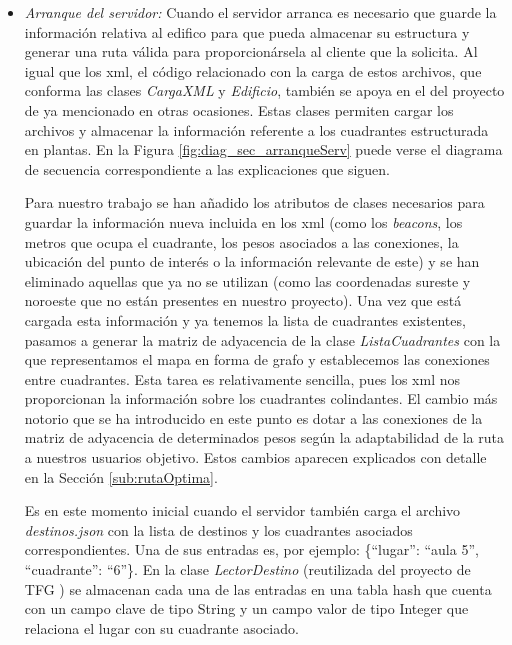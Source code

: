\begin{itemize}
	\item \textit{Arranque del servidor:} Cuando el servidor arranca es necesario que guarde la información relativa al edifico para que pueda almacenar su estructura y generar una ruta válida para proporcionársela al cliente que la solicita. Al igual que los xml, el código relacionado con la carga de estos archivos, que conforma las clases \textit{CargaXML} y \textit{Edificio}, también se apoya en el del proyecto de \cite{TFGguia} ya mencionado en otras ocasiones. Estas clases permiten cargar los archivos y almacenar la información referente a los cuadrantes estructurada en plantas. En la Figura \ref{fig:diag_sec_arranqueServ} puede verse el diagrama de secuencia correspondiente a las explicaciones que siguen.
	
	Para nuestro trabajo se han añadido los atributos de clases necesarios para guardar la información nueva incluida en los xml (como los \textit{beacons}, los metros que ocupa el cuadrante, los pesos asociados a las conexiones, la ubicación del punto de interés o la información relevante de este) y se han eliminado aquellas que ya no se utilizan (como las coordenadas sureste y noroeste que no están presentes en nuestro proyecto). Una vez que está cargada esta información y ya tenemos la lista de cuadrantes existentes, pasamos a generar la matriz de adyacencia de la clase \textit{ListaCuadrantes} con la que representamos el mapa en forma de grafo y establecemos las conexiones entre cuadrantes. Esta tarea es relativamente sencilla, pues los xml nos proporcionan la información sobre los cuadrantes colindantes. El cambio más notorio que se ha introducido en este punto es dotar a las conexiones de la matriz de adyacencia de determinados pesos según la adaptabilidad de la ruta a nuestros usuarios objetivo. Estos cambios aparecen explicados con detalle en la Sección \ref{sub:rutaOptima}. 
	
	Es en este momento inicial cuando el servidor también carga el archivo \textit{destinos.json} con la lista de destinos y los cuadrantes asociados correspondientes. Una de sus entradas es, por ejemplo: \{``lugar'': ``aula 5'', ``cuadrante'': ``6''\}. En la clase \textit{LectorDestino} (reutilizada del proyecto de TFG \citep{TFGguia}) se almacenan cada una de las entradas en una tabla hash que cuenta con un campo clave de tipo String y un campo valor de tipo Integer que relaciona el lugar con su cuadrante asociado. 
	
	
	

\end{itemize}
